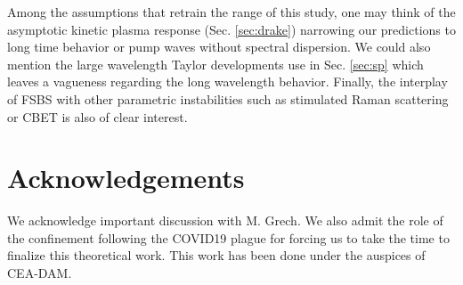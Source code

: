 \documentclass[
 reprint,
 amsmath,amssymb,
 aps,
]{revtex4-1}
\begin{document}
Among the assumptions that retrain the range of this study, one may think of the asymptotic kinetic plasma response (Sec. \ref{sec:drake}) narrowing our predictions to long time behavior or pump waves without spectral dispersion. 
We could also mention the large wavelength Taylor developments use in Sec. 
\ref{sec:sp} which  leaves a vagueness regarding the long wavelength behavior. Finally, the interplay of FSBS with other parametric instabilities such as stimulated Raman scattering or CBET is also of clear interest. 


\section*{Acknowledgements}
We acknowledge important discussion with M. Grech.  We also admit the role of the confinement following the COVID19 plague for forcing us to take the time to finalize this theoretical work. This work has been done under the auspices of CEA-DAM. 

\end{document}
